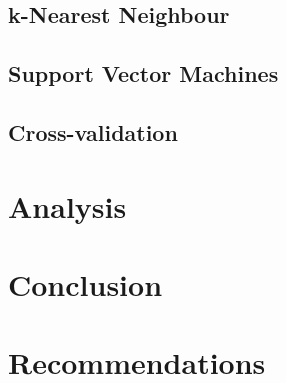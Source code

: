 \documentclass[10pt,a4paper]{article}
\begin{document}
\subsection{k-Nearest Neighbour}

\subsection{Support Vector Machines}

\subsection{Cross-validation}

\section{Analysis}

\section{Conclusion}

\section{Recommendations}



\appendix
\appendixpage
\end{document}
